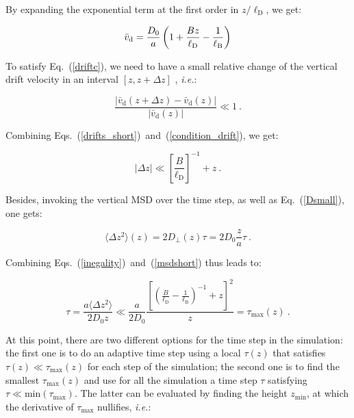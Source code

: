 By expanding the exponential term at the first order in $z/\ell_\mathrm{D}$, we get:

\begin{equation}
	\begin{aligned}
		\bar{v}_\textnormal{d}  = \frac{D_0}{a} \left( 1 + \frac{B z}{\ell_\mathrm{D}} - \frac{1}{\ell_{\mathrm{B}}}\right)
	\end{aligned}
	\label{drifts_short}
\end{equation}

To satisfy Eq.~(\ref{driftc}), we need to have a small relative change of the vertical drift velocity in an interval $[z, z+\Delta z]$ \cite{matse_state-dependent_nodate}, \textit{i.e.}:

\begin{equation}
	\frac{|\bar{v}_\mathrm{d} (z + \Delta z) - \bar{v}_\mathrm{d} (z)|}{|\bar{v}_\mathrm{d} (z)|} \ll 1 ~.
	\label{condition_drift}
\end{equation}

Combining Eqs.~(\ref{drifts_short})~and~(\ref{condition_drift}), we get:

\begin{equation}
	|\Delta z |\ll \left[\frac{B}{\ell_{\mathrm{D}}}\right]^{-1} + z ~.
	\label{inegality}
\end{equation}


Besides, invoking the vertical \gls{MSD} over the time step, as well as Eq.~(\ref{Dsmall}), one gets:

\begin{equation}
	\langle \Delta z ^2 \rangle (z) = 2 D_\bot (z) \tau = 2D_0 \frac{z}{a}\tau ~.
	\label{msdshort}
\end{equation}

Combining Eqs.~(\ref{inegality})~and~(\ref{msdshort}) thus leads to:

\begin{equation}
	\tau = \frac{a\langle \Delta z ^2 \rangle }{2 D_0 z} \ll \frac{a}{2 D_0 } \frac{\left[\left(\frac{B}{\ell_\mathrm{D}} - \frac{1}{\ell_{\mathrm{B}}}\right)^{-1} + z\right] ^2}{z} = \tau_\mathrm{max} (z)~.
	\label{taumax}
\end{equation}

 At this point, there are two different options for the time step in the simulation: the first one is to do an adaptive time step using a local $\tau(z)$ that satisfies $\tau(z) \ll \tau_{\textrm{max}}(z)$ for each step of the simulation; the second one is to find the smallest $\tau_\mathrm{max}(z)$ and use for all the simulation a time step $\tau$ satisfying $\tau \ll \mathrm{min}(\tau_\mathrm{max}) $. The latter can be evaluated by finding the height $z_\mathrm{min}$, at which the derivative of $ \tau_\mathrm{max}$ nullifies, \textit{i.e.}:

